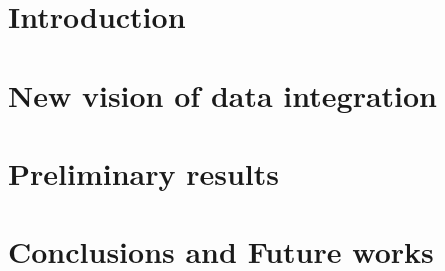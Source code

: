 \documentclass{vldb}
\begin{document}
\section{Introduction}


\section{New vision of data integration}


\section{Preliminary results}


\section{Conclusions and Future works}







  
\end{document}
